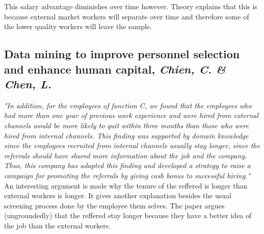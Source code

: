 \documentclass[a4paper, 11pt]{article} %
\begin{document}
This salary advantage diminishes over time however. Theory explains that this is because external market workers will separate over
time and therefore some of the lower quality workers will leave the sample.

\subsection*{Data mining to improve personnel selection and enhance human capital, \emph{Chien, C. \& Chen, L.} \cite{sixth}}

\emph{"In addition, for
the employees of function C, we found that the
employees who had more than one year of previous
work experience and were hired from external channels
would be more likely to quit within three months than those who were hired from internal channels. This finding was supported by domain knowledge
since the employees recruited from internal channels
usually stay longer, since the referrals should have
shared more information about the job and the company.
Thus, this company has adapted this finding
and developed a strategy to raise a campaign for promoting
the referrals by giving cash bonus to successful
hiring."} \\

An interesting argument is made why the tenure of the reffered is longer than external workers is longer. It gives another explanation besides
the usual screening process done by the employee them selves. The paper argues (ungroundedly) that the reffered stay longer because they have
a better idea of the job than the external workers. 
\end{document}
